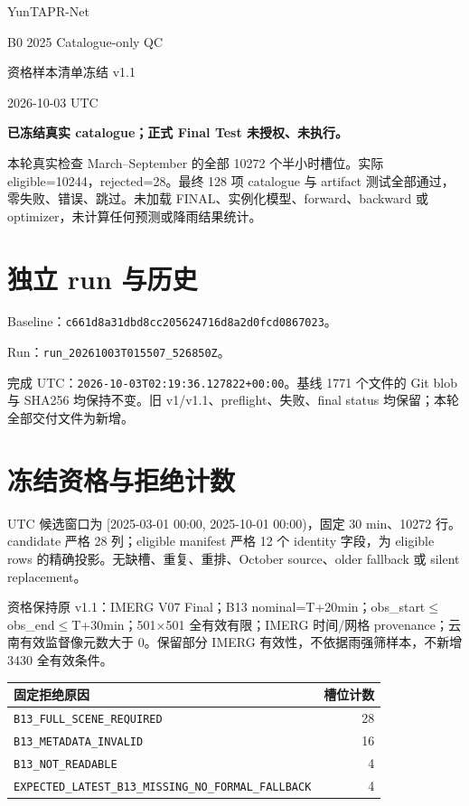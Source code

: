 \documentclass[UTF8,11pt,a4paper,fontset=windows]{ctexart}
\begin{document}
\begin{center}{\LARGE YunTAPR-Net}\par{\Large B0 2025 Catalogue-only QC}\par{\Large 资格样本清单冻结 v1.1}\par 2026-10-03 UTC\end{center}
\textbf{已冻结真实 catalogue；正式 Final Test 未授权、未执行。}

本轮真实检查 March--September 的全部 10272 个半小时槽位。实际 eligible=10244，rejected=28。最终 128 项 catalogue 与 artifact 测试全部通过，零失败、错误、跳过。未加载 FINAL、实例化模型、forward、backward 或 optimizer，未计算任何预测或降雨结果统计。

\section*{独立 run 与历史}
Baseline：{\small\texttt{c661d8a31dbd8cc205624716d8a2d0fcd0867023}}。\par
Run：{\small\texttt{run\_20261003T015507\_526850Z}}。\par
完成 UTC：\texttt{2026-10-03T02:19:36.127822+00:00}。基线 1771 个文件的 Git blob 与 SHA256 均保持不变。旧 v1/v1.1、preflight、失败、final status 均保留；本轮全部交付文件为新增。

\section*{冻结资格与拒绝计数}
UTC 候选窗口为 [2025-03-01 00:00, 2025-10-01 00:00)，固定 30 min、10272 行。candidate 严格 28 列；eligible manifest 严格 12 个 identity 字段，为 eligible rows 的精确投影。无缺槽、重复、重排、October source、older fallback 或 silent replacement。

资格保持原 v1.1：IMERG V07 Final；B13 nominal=T+20min；obs\_start$\leq$obs\_end$\leq$T+30min；501×501 全有效有限；IMERG 时间/网格 provenance；云南有效监督像元数大于 0。保留部分 IMERG 有效性，不依据雨强筛样本，不新增 3430 全有效条件。

\begin{tabular}{p{132mm}r}\hline 固定拒绝原因 & 槽位计数\\\hline
{\scriptsize\texttt{B13\_FULL\_SCENE\_REQUIRED}} & 28 \\
{\scriptsize\texttt{B13\_METADATA\_INVALID}} & 16 \\
{\scriptsize\texttt{B13\_NOT\_READABLE}} & 4 \\
{\scriptsize\texttt{EXPECTED\_LATEST\_B13\_MISSING\_NO\_FORMAL\_FALLBACK}} & 4 \\
\hline\end{tabular}
\end{document}
